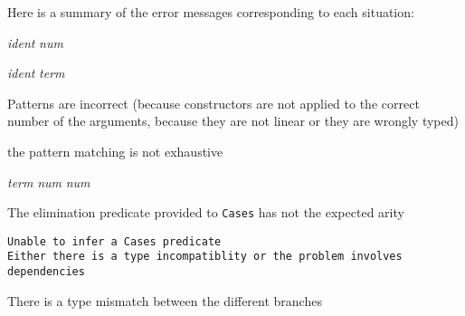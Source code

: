 Here is a summary of the error messages corresponding to each situation:

\begin{ErrMsgs}
\item {} {\sl
    ident}  {\sl num} 
  
  {\sl ident}  {\sl term}
  
  {\term}
  {\term} 

 Patterns are incorrect (because constructors are not applied to
  the correct number of the arguments, because they are not linear or
  they are wrongly typed)

\item {}

the pattern matching is not exhaustive

\item {} {\sl term}  {\sl num}  {\sl
    num} 

The elimination predicate provided to \texttt{Cases} has not the
  expected arity



 
  
\item {\tt Unable to infer a Cases predicate\\
    Either there is a type incompatiblity or the problem involves\\
    dependencies}
 
  There is a type mismatch between the different branches


\end{ErrMsgs}

